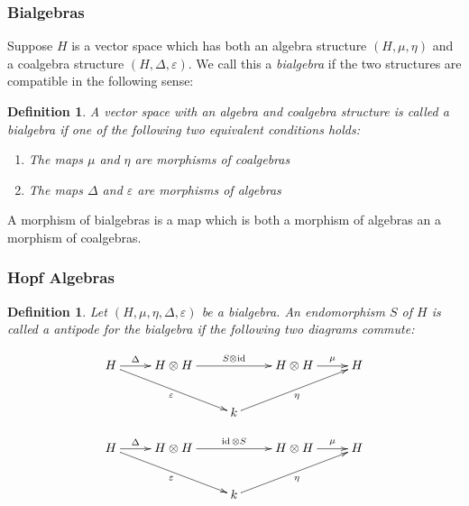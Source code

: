 \documentclass[]{article}
\newtheorem{defn}[theorem]{Definition}
\newcommand{\id}{\operatorname{id}}
\numberwithin{equation}{subsection}
\begin{document}
\subsubsection{Bialgebras}

Suppose $H$ is a vector space which has both an algebra structure $(H, \mu,
\eta)$ and a coalgebra structure $(H, \Delta, \varepsilon)$. We call this a
\emph{bialgebra} if the two structures are compatible in the following sense:

\begin{defn}
    A vector space with an algebra and coalgebra structure is called a
    \emph{bialgebra} if one of the following two equivalent conditions holds:

    \begin{enumerate}
        \item The maps $\mu$ and $\eta$ are morphisms of coalgebras
        \item The maps $\Delta$ and $\varepsilon$ are morphisms of algebras
    \end{enumerate}
\end{defn}

A morphism of bialgebras is a map which is both a morphism of algebras an a
morphism of coalgebras.
\subsubsection{Hopf Algebras}


\begin{defn}
    Let $(H, \mu, \eta, \Delta, \varepsilon)$ be a bialgebra. An endomorphism
    $S$ of $H$ is called a \emph{antipode} for the bialgebra if the following
    two diagrams commute:

    \begin{equation}
        \xymatrix{
        H \ar[r]^-{\Delta} \ar[rrd]_-{\varepsilon}& H \otimes H \ar[rr]^-{S \otimes \id} & & H \otimes H \ar[r]^-{\mu} & H \\
        & & k \ar[rru]_-{\eta}& &
        }
    \end{equation}

    \begin{equation}
        \xymatrix{
        H \ar[r]^-{\Delta} \ar[rrd]_-{\varepsilon}& H \otimes H \ar[rr]^-{\id \otimes S} & & H \otimes H \ar[r]^-{\mu} & H \\
        & & k \ar[rru]_-{\eta}& &
        }
    \end{equation}
\end{defn}
\end{document}

